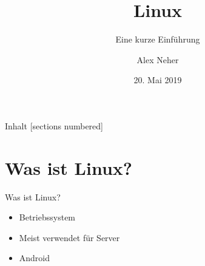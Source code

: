 \documentclass[10pt]{beamer}
\title{Linux}
\subtitle{Eine kurze Einführung}
\date{20. Mai 2019}
\author{Alex Neher}
\begin{document}
\pagestyle{empty}
	
\begin{frame}

\end{frame}

\maketitle

\begin{frame}{Inhalt}
  [sections numbered]
  \tableofcontents[hideallsubsections]
\end{frame}

\section{Was ist Linux?}

\begin{frame}{Was ist Linux?}
    \begin{itemize}[<+- | alert@+>]
        \item Betriebssystem
        \item Meist verwendet für Server
        \item Android
    \end{itemize}

\end{frame}
\end{document}
